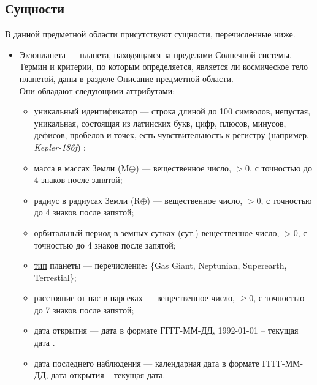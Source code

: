 \documentclass[14pt,a4paper]{extarticle}
\begin{document}
	\subsection{Сущности}
	В данной предметной области присутствуют сущности, перечисленные ниже.
	\begin{itemize}
		\item Экзопланета --- планета, находящаяся за пределами Солнечной системы. Термин и критерии, по которым определяется, является ли космическое тело планетой, даны в разделе \hyperref[object-description]{\underline{Описание предметной области}}.\\
		Они обладают следующими аттрибутами:
		\begin{itemize}
			\item уникальный идентификатор --- строка длиной до 100 символов, непустая, уникальная, состоящая из латинских букв, цифр, плюсов, минусов, дефисов, пробелов и точек, есть чувствительность к регистру (например, \textit{Kepler-186f}) \cite{names-standards};
			\item масса в массах Земли (M$ \oplus $) --- вещественное число, $> 0$, с точностью до 4 знаков после запятой;
			\item радиус в радиусах Земли (R$ \oplus $) --- вещественное число, $> 0$, с точностью до 4 знаков после запятой;
			\item орбитальный период в земных сутках (сут.) вещественное число, $> 0$, с точностью до 4 знаков после запятой;
			\item \hyperref[types]{\underline{тип}} планеты --- перечисление: \{Gas Giant, Neptunian, Superearth, Terrestial\};
			\item расстояние от нас в парсеках --- вещественное число, $\geq 0$, с точностью до 7 знаков после запятой;
			\item дата открытия --- дата в формате ГГГГ-ММ-ДД, 1992-01-01 -- текущая дата \cite{first-exoplanet-date}.
			\item дата последнего наблюдения --- календарная дата в формате ГГГГ-ММ-ДД, дата открытия -- текущая дата.
		\end{itemize}
		

\end{itemize}
\end{document}
